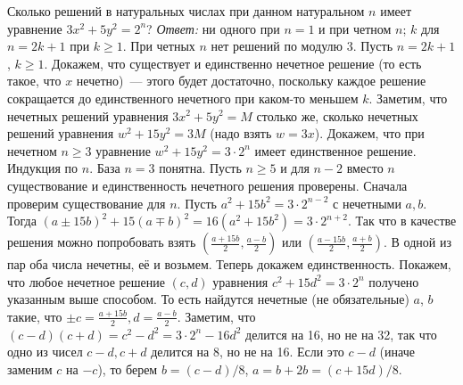 \problem{}
Сколько решений в натуральных числах при данном натуральном $n$ имеет уравнение
$3 x^2 + 5 y^2 = 2^n$?
\solution
\emph{Ответ:}
ни одного при $n = 1$ и при четном $n$;
$k$ для $n = 2 k + 1$ при $k \geq 1$.
%
При четных $n$ нет решений по модулю 3.
Пусть $n = 2 k + 1$, $k \geq 1$.
Докажем, что существует и единственно нечетное решение
(то есть такое, что $x$ нечетно)~--- этого будет достаточно, поскольку каждое
решение сокращается до единственного нечетного при каком-то меньшем $k$.
Заметим, что нечетных решений уравнения $3 x^2 + 5 y^2 = M$ столько же, сколько
нечетных решений уравнения $w^2 + 15 y^2 = 3 M$ (надо взять $w = 3 x$).
Докажем, что при нечетном $n \geq 3$ уравнение $w^2 + 15 y^2 = 3 \cdot 2^n$
имеет единственное решение.
Индукция по $n$.
База $n = 3$ понятна.
Пусть $n \geq 5$ и для $n - 2$ вместо $n$ существование и единственность
нечетного решения проверены.
Сначала проверим существование для $n$.
Пусть $a^2 + 15 b^2 = 3 \cdot 2^{n - 2}$ с нечетными $a, b$.
Тогда
\(
    (a \pm 15 b)^2 + 15(a \mp b)^2
=
    16(a^2 + 15 b^2)
=
    3 \cdot 2^{n + 2}
\).
Так что в качестве решения можно попробовать взять
$(\frac{a + 15 b}{2}, \frac{a - b}{2})$
или
$(\frac{a - 15 b}{2}, \frac{a + b}{2})$.
В одной из пар оба числа нечетны, её и возьмем.
Теперь докажем единственность.
Покажем, что любое нечетное решение $(c, d)$ уравнения
$c^2 + 15 d^2 = 3 \cdot 2^n$ получено указанным выше способом.
То есть найдутся нечетные (не обязательные) $a$, $b$ такие, что
$\pm c = \frac{a + 15 b}{2}, d = \frac{a - b}{2}$.
Заметим, что $(c - d)(c + d) = c^2 - d^2 = 3 \cdot 2^n - 16 d^2$ делится на 16,
но не на 32, так что одно из чисел $c - d, c + d$ делится на 8, но не на 16.
Если это $c - d$ (иначе заменим $c$ на $-c$), то берем $b = (c - d) / 8$,
$a = b + 2 b = (c + 15 d) / 8$.
\endproblem
